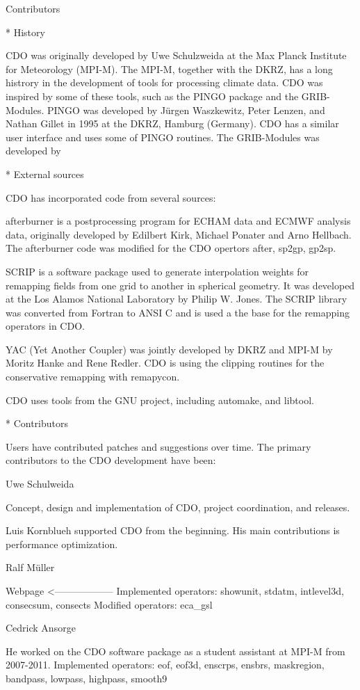 Contributors

* History

CDO was originally developed by Uwe Schulzweida at the Max Planck
Institute for Meteorology (MPI-M).
The MPI-M, together with the DKRZ, has a long histrory in the development of tools for processing climate data.
CDO was inspired by some of these tools, such as the PINGO package and the GRIB-Modules. 
PINGO was developed by Jürgen Waszkewitz, Peter Lenzen, and Nathan Gillet in 1995 at the DKRZ, Hamburg (Germany).
CDO has a similar user interface and uses some of PINGO routines.
The GRIB-Modules was developed by 

* External sources

CDO has incorporated code from several sources:

afterburner is a postprocessing program for ECHAM data and ECMWF analysis data,
originally developed by Edilbert Kirk, Michael Ponater and Arno Hellbach.
The afterburner code was modified for the CDO opertors after, sp2gp, gp2sp.

SCRIP is a software package used to generate interpolation weights for remapping
fields from one grid to another in spherical geometry.
It was developed at the Los Alamos National Laboratory by Philip W. Jones.
The SCRIP library was converted from Fortran to ANSI C and is used a
the base for the remapping operators in CDO.

YAC (Yet Another Coupler) was jointly developed by DKRZ and MPI-M by Moritz Hanke and Rene Redler.
CDO is using the clipping routines for the conservative remapping with remapycon.

CDO uses tools from the GNU project, including automake, and libtool. 

* Contributors

Users have contributed patches and suggestions over time.
The primary contributors to the CDO development have been: 

Uwe Schulweida

Concept, design and implementation of CDO, project coordination, and releases.

Luis Kornblueh
supported CDO from the beginning. His main contributions is performance optimization.

Ralf Müller

Webpage <------------------
Implemented operators: showunit, stdatm, intlevel3d, consecsum, consects
Modified operators: eca_gsl

Cedrick Ansorge

He worked on the CDO software package as a student assistant at MPI-M from 2007-2011.
Implemented operators: eof, eof3d, enscrps, ensbrs, maskregion, bandpass, lowpass, highpass, smooth9

